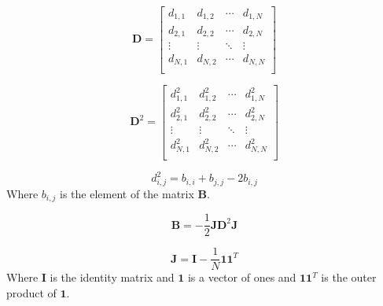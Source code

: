 \documentclass[8pt]{article}
\begin{document}
\begin{multicols}{2}
\begin{equation}
    \mathbf{D} = \begin{bmatrix}
        d_{1,1} & d_{1,2} & \cdots & d_{1,N} \\
        d_{2,1} & d_{2,2} & \cdots & d_{2,N} \\
        \vdots & \vdots & \ddots & \vdots \\
        d_{N,1} & d_{N,2} & \cdots & d_{N,N} \\
    \end{bmatrix}
\end{equation}

\begin{equation}
    \mathbf{D}^2 = \begin{bmatrix}
        d_{1,1}^2 & d_{1,2}^2 & \cdots & d_{1,N}^2 \\
        d_{2,1}^2 & d_{2,2}^2 & \cdots & d_{2,N}^2 \\
        \vdots & \vdots & \ddots & \vdots \\
        d_{N,1}^2 & d_{N,2}^2 & \cdots & d_{N,N}^2 \\
    \end{bmatrix}
\end{equation}

\begin{equation}
    d_{i,j}^2 = b_{i,i} + b_{j,j} - 2b_{i,j}
\end{equation}
Where $b_{i,j}$ is the element of the matrix $\mathbf{B}$.

\begin{equation}
    \mathbf{B} = -\frac{1}{2} \mathbf{J} \mathbf{D}^2 \mathbf{J}
\end{equation}

\begin{equation}
    \mathbf{J} = \mathbf{I} - \frac{1}{N} \mathbf{1} \mathbf{1}^T
\end{equation}
Where $\mathbf{I}$ is the identity matrix and $\mathbf{1}$ is a vector of ones and $\mathbf{11}^T$ is the outer product of $\mathbf{1}$.


\end{multicols}
\end{document}
